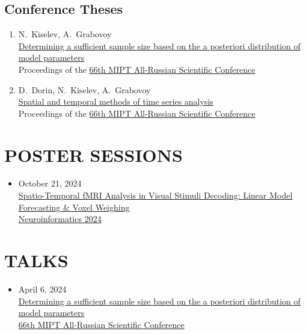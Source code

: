 \documentclass[11pt,a4paper]{moderncv}
\begin{document}
\subsection{Conference Theses}
\begin{enumerate}%
    \item N.~Kiselev, A.~Grabovoy\\
    \href{https://old.mipt.ru/upload/medialibrary/d79/fpmi.pdf}{Determining a sufficient sample size based on the a posteriori distribution of model parameters}\\
    Proceedings of the \href{https://conf.mipt.ru/}{66th MIPT All-Russian Scientific Conference}
    \item D.~Dorin, N.~Kiselev, A.~Grabovoy\\
    \href{https://old.mipt.ru/upload/medialibrary/d79/fpmi.pdf}{Spatial and temporal methods of time series analysis}\\
    Proceedings of the \href{https://conf.mipt.ru/}{66th MIPT All-Russian Scientific Conference}
\end{enumerate}

\section{POSTER SESSIONS}
\begin{itemize}
    \item October 21, 2024\\
    \href{https://github.com/DorinDaniil/Forecasting-fMRI-Images/blob/main/poster/poster.pdf}{Spatio-Temporal fMRI Analysis in Visual Stimuli Decoding: Linear Model Forecasting \& Voxel Weighing}\\
    \href{https://neuroinfo.ru/index.php/en/}{Neuroinformatics 2024}
\end{itemize}

\section{TALKS}
\begin{itemize}
    \item April 6, 2024\\
    \href{https://www.youtube.com/live/WnIRaRl730A?si=q0eScgnDP2ZidCpK&t=1723}{Determining a sufficient sample size based on the a posteriori distribution of model parameters}\\
    \href{https://conf.mipt.ru/}{66th MIPT All-Russian Scientific Conference}
\end{itemize}
\end{document}
